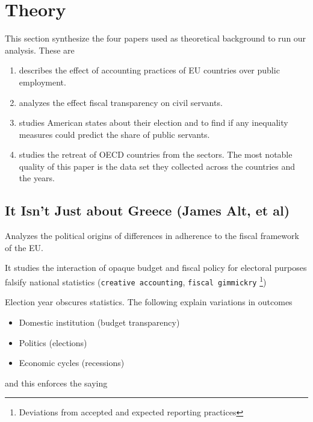 \section{Theory}\label{Theory}

This section synthesize the four papers used as theoretical background to run
our analysis. These are

\begin{enumerate}
\item \cite{alt2014isn} describes the effect of accounting practices of EU
  countries over public employment.
\item \cite{aaskoven2015fiscal} analyzes the effect fiscal transparency on
  civil servants.
\item \cite{alesina2000redistributive} studies American states about their
  election and to find if any inequality measures could predict the share of
  public servants.
\item \cite{schuster2013retreat} studies the retreat of OECD countries from the
  sectors. The most notable quality of this paper is the data set they
  collected across the countries and the years.
\end{enumerate}


\subsection{It Isn't Just about Greece (James Alt, et
al)}\label{it-isnt-just-about-greece-james-alt-et-al}

Analyzes the political origins of differences in adherence to the fiscal
framework of the EU.

It studies the interaction of opaque budget and fiscal policy for
electoral purposes falsify national statistics
(\texttt{creative accounting}, \texttt{fiscal gimmickry} \footnote{Deviations
  from accepted and expected reporting practices})

Election year obscures statistics. The following explain variations in
outcomes

\begin{itemize}
\itemsep1pt\parskip0pt
\item
  Domestic institution (budget transparency)
\item
  Politics (elections)
\item
  Economic cycles (recessions)
\end{itemize}

and this enforces the saying

